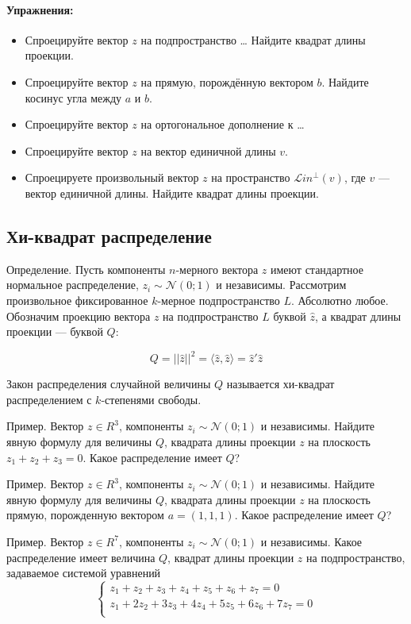 \documentclass[11pt,russian,]{article}
\let\oldparagraph\paragraph
\renewcommand{\paragraph}[1]{\oldparagraph{#1}\mbox{}}
\newcommand{\cN}{\mathcal{N}}
\newcommand{\1}{\mathbbm{1}}
\newcommand{\Lin}{\mathcal{L}in}
\newcommand{\Linp}{\Lin^{\perp}}
\begin{document}
\paragraph{Упражнения:}\label{-1}

\begin{itemize}
\item
  Спроецируйте вектор \(z\) на подпространство \ldots{} Найдите квадрат
  длины проекции.
\item
  Спроецируйте вектор \(z\) на прямую, порождённую вектором \(b\).
  Найдите косинус угла между \(a\) и \(b\).
\item
  Спроецируйте вектор \(z\) на ортогональное дополнение к \ldots{}
\item
  Спроецируйте вектор \(z\) на вектор единичной длины \(v\).
\item
  Спроецируете произвольный вектор \(z\) на пространство \(\Linp(v)\),
  где \(v\) --- вектор единичной длины. Найдите квадрат длины проекции.
\end{itemize}

\subsection{Хи-квадрат распределение}\label{--}

Определение. Пусть компоненты \(n\)-мерного вектора \(z\) имеют
стандартное нормальное распределение, \(z_i \sim \cN(0;1)\) и
независимы. Рассмотрим произвольное фиксированное \(k\)-мерное
подпространство \(L\). Абсолютно любое. Обозначим проекцию вектора \(z\)
на подпространство \(L\) буквой \(\hat z\), а квадрат длины проекции ---
буквой \(Q\):

\[
Q = ||\hat z||^2 = \langle \hat z, \hat z\rangle = \hat z'\hat z
\]

Закон распределения случайной величины \(Q\) называется хи-квадрат
распределением с \(k\)-степенями свободы.

Пример. Вектор \(z \in R^3\), компоненты \(z_i \sim \cN(0;1)\) и
независимы. Найдите явную формулу для величины \(Q\), квадрата длины
проекции \(z\) на плоскость \(z_1 + z_2 + z_3 =0\). Какое распределение
имеет \(Q\)?

Пример. Вектор \(z \in R^3\), компоненты \(z_i \sim \cN(0;1)\) и
независимы. Найдите явную формулу для величины \(Q\), квадрата длины
проекции \(z\) на плоскость прямую, порожденную вектором
\(a = (1, 1, 1)\). Какое распределение имеет \(Q\)?

Пример. Вектор \(z \in R^7\), компоненты \(z_i \sim \cN(0;1)\) и
независимы. Какое распределение имеет величина \(Q\), квадрат длины
проекции \(z\) на подпространство, задаваемое системой уравнений \[
\begin{cases}
z_1 + z_2 + z_3 +z_4 + z_5 +z_6 + z_7 = 0 \\
z_1 + 2z_2 +3z_3 +4z_4 +5z_5+6z_6+7z_7 =0 \\
\end{cases}
\]
\end{document}
